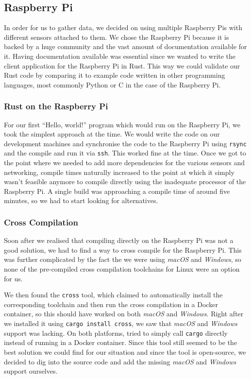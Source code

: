 \subsection{Raspberry Pi}

In order for us to gather data, we decided on using multiple Raspberry Pis with different sensors
attached to them. We chose the Raspberry Pi because it is backed by a huge community and the vast
amount of documentation available for it. Having documentation available was essential since we
wanted to write the client application for the Raspberry Pi in Rust. This way we could validate our
Rust code by comparing it to example code written in other programming languages, most commonly
Python or C in the case of the Raspberry Pi.

\subsubsection{Rust on the Raspberry Pi}

For our first “Hello, world!” program which would run on the Raspberry Pi, we took the simplest
approach at the time. We would write the code on our development machines and synchronise the code
to the Raspberry Pi using \texttt{rsync} and the compile and run it via \texttt{ssh}. This worked
fine at the time. Once we got to the point where we needed to add more dependencies for the various
sensors and networking, compile times naturally increased to the point at which it simply wasn't
feasible anymore to compile directly using the inadequate processor of the Raspberry Pi. A single
build was approaching a compile time of around five minutes, so we had to start looking for
alternatives.

\subsubsection{Cross Compilation}

Soon after we realised that compiling directly on the Raspberry Pi was not a good solution, we had
to find a way to cross compile for the Raspberry Pi. This was further complicated by the fact the we
were using \textit{macOS} and \textit{Windows}, so none of the pre-compiled cross compilation
toolchains for Linux were an option for us.

We then found the \texttt{cross} tool, which claimed to automatically install the corresponding
toolchain and then run the cross compilation in a Docker container, so this should have worked on
both \textit{macOS} and \textit{Windows}. Right after we installed it using \texttt{cargo install
cross}, we saw that \textit{macOS} and \textit{Windows} support was lacking. On both platforms,
tried to simply call \texttt{cargo} directly instead of running in a Docker container. Since this
tool still seemed to be the best solution we could find for our situation and since the tool is
open-source, we decided to dig into the source code and add the missing \textit{macOS} and
\textit{Windows} support ourselves.

